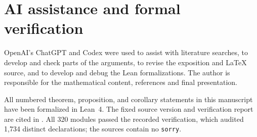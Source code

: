\documentclass[a4paper,12pt]{article}
\numberwithin{equation}{section}
\begin{document}
\section*{AI assistance and formal verification}
OpenAI's ChatGPT and Codex were used to assist with literature searches,
to develop and check parts of the arguments, to revise the exposition
and LaTeX source, and to develop and debug the Lean formalizations.
The author is responsible for the mathematical content, references and
final presentation.

All numbered theorem, proposition, and corollary statements in this
manuscript have been formalized in Lean~4. The fixed source version and
verification report are cited in \cite{LiLean}. All 320 modules passed the
recorded verification, which audited 1,734 distinct declarations; the
sources contain no \texttt{sorry}.
\end{document}
